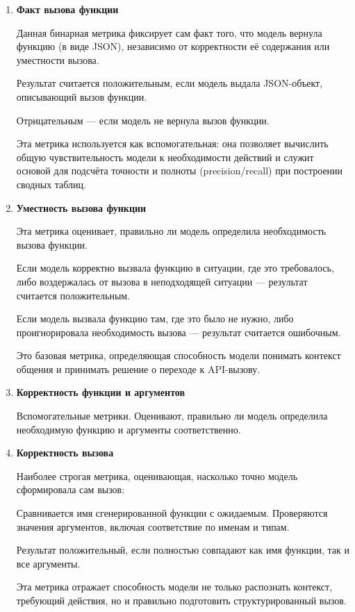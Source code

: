 \documentclass[14pt]{extarticle}
\begin{document}
\begin{enumerate}
\item \textbf{Факт вызова функции}%

Данная бинарная метрика фиксирует сам факт того, что модель вернула функцию (в виде JSON), независимо от корректности её содержания или уместности вызова.

Результат считается положительным, если модель выдала JSON-объект, описывающий вызов функции.

Отрицательным — если модель не вернула вызов функции.

Эта метрика используется как вспомогательная: она позволяет вычислить общую чувствительность модели к необходимости действий и служит основой для подсчёта точности и полноты (precision/recall) при построении сводных таблиц.

\item \textbf{Уместность вызова функции}%

Эта метрика оценивает, правильно ли модель определила необходимость вызова функции.

Если модель корректно вызвала функцию в ситуации, где это требовалось, либо воздержалась от вызова в неподходящей ситуации — результат считается положительным.

Если модель вызвала функцию там, где это было не нужно, либо проигнорировала необходимость вызова — результат считается ошибочным.

Это базовая метрика, определяющая способность модели понимать контекст общения и принимать решение о переходе к API-вызову.

\item \textbf{Корректность функции и аргументов}

Вспомогательные метрики. Оценивают, правильно ли модель определила необходимую функцию и аргументы соответственно.

\item \textbf{Корректность вызова}%

Наиболее строгая метрика, оценивающая, насколько точно модель сформировала сам вызов:

Сравнивается имя сгенерированной функции с ожидаемым.
Проверяются значения аргументов, включая соответствие по именам и типам.

Результат положительный, если полностью совпадают как имя функции, так и все аргументы.

Эта метрика отражает способность модели не только распознать контекст, требующий действия, но и правильно подготовить структурированный вызов.
\end{enumerate}
\end{document}
